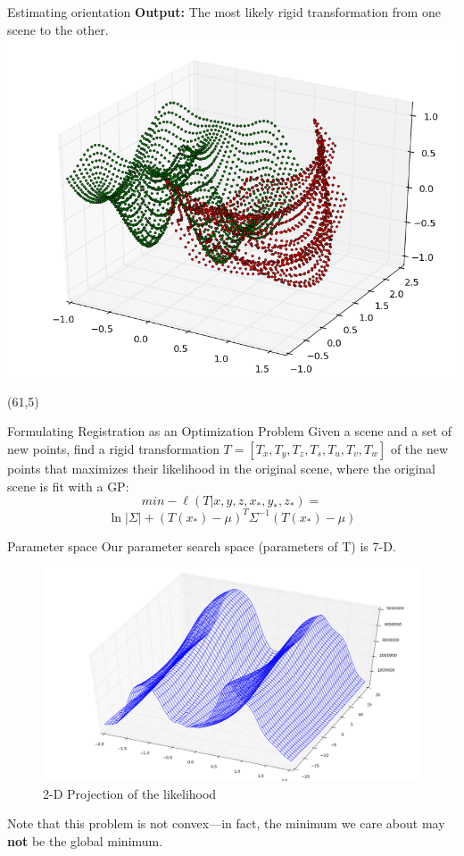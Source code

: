 \documentclass[final]{beamer}
\begin{document}
\begin{frame}{}
\begin{textblock}{27.5}
\begin{block}{Estimating orientation}
\textbf{Output:} The most likely rigid transformation from one scene to the other.
\includegraphics[width=10in]{3DWorldModel.png}
\end{block}

\end{textblock}

\begin{textblock}{27}(61,5)




\begin{block}{Formulating Registration as an Optimization Problem}
Given a scene and a set of new points, find a rigid transformation $T = [T_x,T_y,T_z,T_s,T_u,T_v,T_w]$ of the new points 
that maximizes their likelihood in the original scene, where the original scene is fit with a GP:
$$min -\ell(T|x,y,z,x_*,y_*,z_*) =$$
$$ \ln|\Sigma| + (T(x_*) - \mu)^T \Sigma^{-1} (T(x_*) - \mu)$$

\end{block}


\begin{block}{Parameter space}
Our parameter search space (parameters of T) is 7-D.
\begin{figure}
\includegraphics[width=10in]{LLProjection.png}
\caption{2-D Projection of the likelihood}
\end{figure}
Note that this problem is not convex---in fact, the minimum we care about may {\bf not} be the global minimum. 
\end{block}


\end{textblock}
\end{frame}
\end{document}
